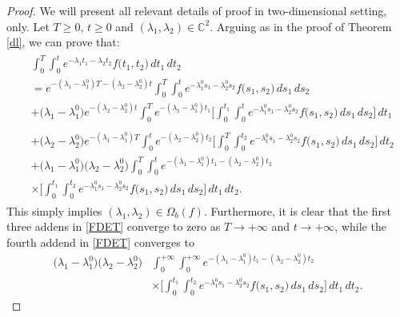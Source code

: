 \documentclass{amsart}
\theoremstyle{definition}
\theoremstyle{remark}
\numberwithin{equation}{section}
\begin{document}
\begin{proof}
We will present all relevant details of proof in two-dimensional setting, only. Let $T\geq 0$, $t\geq 0$ and $(\lambda_{1},\lambda_{2})\in {\mathbb C}^{2}.$ Arguing as in the proof of Theorem \ref{dl}, we can prove that:
{\small
\begin{align}\label{FDET}
\begin{split}
& \int^{T}_{0}\int^{t}_{0}e^{-\lambda_{1}t_{1}-\lambda_{2}t_{2}}f\bigl( t_{1},t_{2}\bigr)\, dt_{1}\, dt_{2}
\\ & =e^{-(\lambda_{1}-\lambda_{1}^{0})T-(\lambda_{2}-\lambda_{2}^{0})t}\int^{T}_{0}\int^{t}_{0}e^{-\lambda_{1}^{0}s_{1}-\lambda_{2}^{0}s_{2}}f\bigl( s_{1},s_{2}\bigr)\, ds_{1}\, ds_{2} 
\\& +\bigl( \lambda_{1}-\lambda_{1}^{0}\bigr)e^{-(\lambda_{2}-\lambda_{2}^{0})t}\int^{T}_{0}e^{-(\lambda_{1}-\lambda_{1}^{0})t_{1}}\Biggl[ \int^{t_{1}}_{0}\int^{t}_{0}e^{-\lambda_{1}^{0}s_{1}-\lambda_{2}^{0}s_{2}}f\bigl( s_{1},s_{2}\bigr)\, ds_{1} \, ds_{2}\Biggr]\, dt_{1} \\
& \\& +\bigl( \lambda_{2}-\lambda_{2}^{0}\bigr)e^{-(\lambda_{1}-\lambda_{1}^{0})T}\int^{t}_{0}e^{-(\lambda_{2}-\lambda_{2}^{0})t_{2}}\Biggl[ \int^{T}_{0}\int^{t_{2}}_{0}e^{-\lambda_{1}^{0}s_{1}-\lambda_{2}^{0}s_{2}}f\bigl( s_{1},s_{2}\bigr)\, ds_{1} \, ds_{2}\Biggr]\, dt_{2}
\\& +\bigl( \lambda_{1}-\lambda_{1}^{0}\bigr)\bigl( \lambda_{2}-\lambda_{2}^{0}\bigr)\int^{T}_{0}\int^{t}_{0}e^{-(\lambda_{1}-\lambda_{1}^{0})t_{1}-(\lambda_{2}-\lambda_{2}^{0})t_{2}}
\\& \times \Biggl[ \int^{t_{1}}_{0}\int^{t_{2}}_{0}e^{-\lambda_{1}^{0}s_{1}-\lambda_{2}^{0}s_{2}}f\bigl( s_{1},s_{2}\bigr)\, ds_{1}\, ds_{2}  \Biggr]\, dt_{1}\, dt_{2}.
\end{split}
\end{align}}
This simply implies $(\lambda_{1},\lambda_{2})\in \Omega_{b}(f).$ Furthermore, it is clear that the first three addens in \eqref{FDET} converge to zero as $T\rightarrow +\infty$ and $t\rightarrow +\infty$, while the fourth addend in \eqref{FDET} converges to
\begin{align*}
\bigl( \lambda_{1}-\lambda_{1}^{0}\bigr)\bigl( \lambda_{2}-\lambda_{2}^{0}\bigr)&\int^{+\infty}_{0}\int^{+\infty}_{0}e^{-(\lambda_{1}-\lambda_{1}^{0})t_{1}-(\lambda_{2}-\lambda_{2}^{0})t_{2}}
\\& \times \Biggl[ \int^{t_{1}}_{0}\int^{t_{2}}_{0}e^{-\lambda_{1}^{0}s_{1}-\lambda_{2}^{0}s_{2}}f\bigl( s_{1},s_{2}\bigr)\, ds_{1}\, ds_{2}  \Biggr]\, dt_{1}\, dt_{2}.

\end{align*}
\end{proof}
\end{document}
